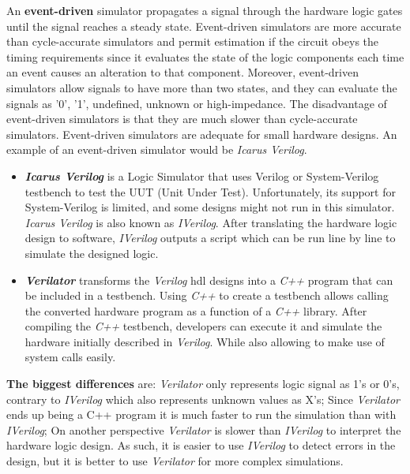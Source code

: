 An \textbf{event-driven} simulator propagates a signal through the hardware logic gates until the signal reaches a steady state. Event-driven simulators are more accurate than cycle-accurate simulators and permit estimation if the circuit obeys the timing requirements since it evaluates the state of the logic components each time an event causes an alteration to that component. Moreover, event-driven simulators allow signals to have more than two states, and they can evaluate the signals as '0', '1', undefined, unknown or high-impedance. The disadvantage of event-driven simulators is that they are much slower than cycle-accurate simulators. Event-driven simulators are adequate for small hardware designs. An example of an event-driven simulator would be \textit{Icarus Verilog}.

\begin{itemize}
    \item \textbf{\textit{Icarus Verilog}} is a Logic Simulator that uses Verilog or System-Verilog testbench to test the UUT (Unit Under Test). Unfortunately, its support for System-Verilog is limited, and some designs might not run in this simulator. \textit{Icarus Verilog} is also known as \textit{IVerilog}. After translating the hardware logic design to software, \textit{IVerilog} outputs a script which can be run line by line to simulate the designed logic.
    
    \item \textbf{\textit{Verilator}} transforms the \textit{Verilog} \acrshort{hdl} designs into a \textit{C++} program that can be included in a testbench. Using \textit{C++} to create a testbench allows calling the converted hardware program as a function of a \textit{C++} library. After compiling the \textit{C++} testbench, developers can execute it and simulate the hardware initially described in \textit{Verilog}. While also allowing to make use of system calls easily.
\end{itemize}

\textbf{The biggest differences} are: \textit{Verilator} only represents logic signal as 1's or 0's, contrary to \textit{IVerilog} which also represents unknown values as X's; Since \textit{Verilator} ends up being a C++ program it is much faster to run the simulation than with \textit{IVerilog}; On another perspective \textit{Verilator} is slower than \textit{IVerilog} to interpret the hardware logic design.
As such, it is easier to use \textit{IVerilog} to detect errors in the design, but it is better to use \textit{Verilator} for more complex simulations.


